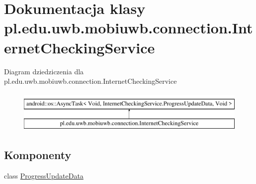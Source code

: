 \hypertarget{classpl_1_1edu_1_1uwb_1_1mobiuwb_1_1connection_1_1_internet_checking_service}{}\section{Dokumentacja klasy pl.\+edu.\+uwb.\+mobiuwb.\+connection.\+Internet\+Checking\+Service}
\label{classpl_1_1edu_1_1uwb_1_1mobiuwb_1_1connection_1_1_internet_checking_service}
Diagram dziedziczenia dla pl.\+edu.\+uwb.\+mobiuwb.\+connection.\+Internet\+Checking\+Service\begin{figure}[H]
\begin{center}
\leavevmode
\includegraphics[height=2.000000cm]{classpl_1_1edu_1_1uwb_1_1mobiuwb_1_1connection_1_1_internet_checking_service}
\end{center}
\end{figure}
\subsection*{Komponenty}
\begin{DoxyCompactItemize}
\item 
class \hyperlink{classpl_1_1edu_1_1uwb_1_1mobiuwb_1_1connection_1_1_internet_checking_service_1_1_progress_update_data}{Progress\+Update\+Data}
\end{DoxyCompactItemize}
